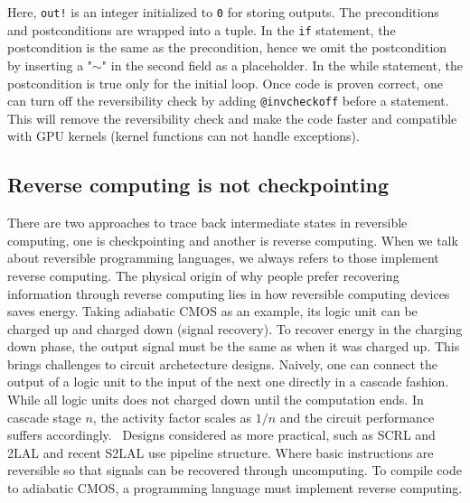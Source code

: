 \documentclass{article}
\newcommand{\<}{\langle}
\renewcommand{\>}{\rangle}
\theoremstyle{definition}\newtheorem{definition}{\textit{Definition}}
\begin{document}
Here, \texttt{out!} is an integer initialized to \texttt{0} for storing outputs.
The preconditions and postconditions are wrapped into a tuple. In the \texttt{if} statement, the postcondition is the same as the precondition, hence we omit the postcondition by inserting a "\texttt{$\sim$}" in the second field as a placeholder.
In the while statement, the postcondition is true only for the initial loop.
Once code is proven correct, one can turn off the reversibility check by adding \texttt{@invcheckoff} before a statement.
This will remove the reversibility check and make the code faster and compatible with GPU kernels (kernel functions can not handle exceptions).

\subsection{Reverse computing is not checkpointing}\label{sec:timespace}
There are two approaches to trace back intermediate states in reversible computing, one is checkpointing and another is reverse computing.
When we talk about reversible programming languages, we always refers to those implement reverse computing. 
The physical origin of why people prefer recovering information through reverse computing lies in how reversible computing devices saves energy.
Taking adiabatic CMOS as an example, its logic unit can be charged up and charged down (signal recovery).
To recover energy in the charging down phase, the output signal must be the same as when it was charged up.
This brings challenges to circuit archetecture designs.
Naively, one can connect the output of a logic unit to the input of the next one directly in a cascade fashion.
While all logic units does not charged down until the computation ends.
In cascade stage $n$, the activity factor scales as $1/n$ and the circuit performance suffers accordingly.~\cite{Athas1994}
Designs considered as more practical, such as SCRL and 2LAL and recent S2LAL use pipeline structure.
Where basic instructions are reversible so that signals can be recovered through uncomputing.
To compile code to adiabatic CMOS, a programming language must implement reverse computing.
\end{document}
